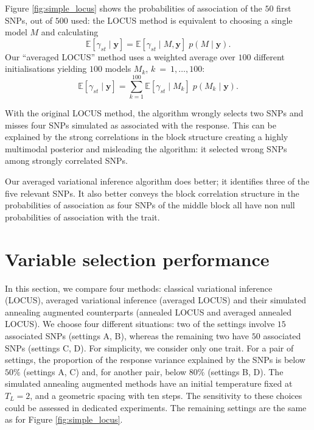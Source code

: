 \documentclass[a4paper, 11pt]{report}
\numberwithin{equation}{chapter}
\begin{document}
Figure \ref{fig:simple_locus} shows the probabilities of association of the $50$ first SNPs, out of $500$ used: the LOCUS method is equivalent to choosing a single model $M$ and calculating
\begin{equation*}
\mathbb{E}\left[\gamma_{st}\mid\boldsymbol{y}\right] = \mathbb{E}\left[\gamma_{st}\mid M,\boldsymbol{y}\right]\;p\left(M\mid\boldsymbol{y}\right).
\end{equation*}
Our ``averaged LOCUS'' method uses a weighted average over $100$ different initialisations yielding $100$ models $ M_k$, $k~=~1,\ldots,100$:
\begin{equation*}
\mathbb{E}\left[\gamma_{st}\mid\boldsymbol{y}\right] = \sum_{k=1}^{100}\mathbb{E}\left[\gamma_{st}\mid M_k\right]\;p\left(M_k\mid\boldsymbol{y}\right).
\end{equation*}

With the original LOCUS method, the algorithm wrongly selects two SNPs and misses four SNPs simulated as associated with the response. This can be explained by the strong correlations in the block structure creating a highly multimodal posterior and misleading the algorithm: it selected wrong SNPs among strongly correlated SNPs.

Our averaged variational inference algorithm does better; it identifies three of the five relevant SNPs. It also better conveys the block correlation structure in the probabilities of association as four SNPs of the middle block all have non null probabilities of association with the trait. 

\section{Variable selection performance} \label{sec:varSelPerf}

In this section, we compare four methods: classical variational inference (LOCUS), averaged variational inference (averaged LOCUS) and their simulated annealing augmented counterparts (annealed LOCUS and averaged annealed LOCUS). We choose four different situations: two of the settings involve $15$ associated SNPs (settings A, B), whereas the remaining two have $50$ associated SNPs (settings C, D). For simplicity, we consider only one trait. For a pair of settings, the proportion of the response variance explained by the SNPs is below $50\%$ (settings A, C) and, for another pair, below $80\%$ (settings B, D). The simulated annealing augmented methods have an initial temperature fixed at $T_L = 2$, and a geometric spacing with ten steps. The sensitivity to these choices could be assessed in dedicated experiments. The remaining settings are the same as for Figure \ref{fig:simple_locus}.
\end{document}
